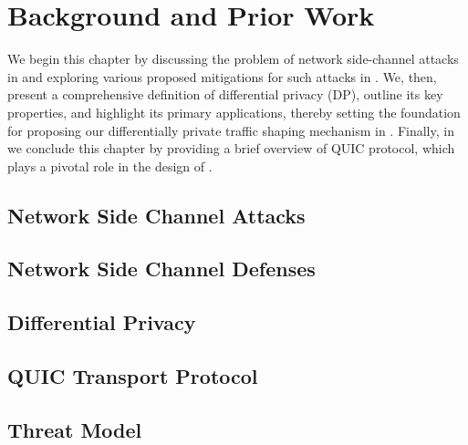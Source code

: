 \chapter{Background and Prior Work}\label{ch:background}





We begin this chapter by discussing the problem of network side-channel attacks in  and exploring various proposed mitigations for such attacks in .
We, then, present a comprehensive definition of differential privacy (DP), outline its key properties, and highlight its primary applications, thereby setting the foundation for proposing our differentially private traffic shaping mechanism in .
Finally, in  we conclude this chapter by providing a brief overview of QUIC protocol, which plays a pivotal role in the design of {\sys}.

\section{Network Side Channel Attacks}\label{sec:ns-attacks}


\section{Network Side Channel Defenses}\label{sec:ns-defenses}


\section{Differential Privacy}\label{sec:dp-background}


\section{QUIC Transport Protocol}\label{sec:background-quic}







\section{Threat Model}\label{sec:threat-model}





